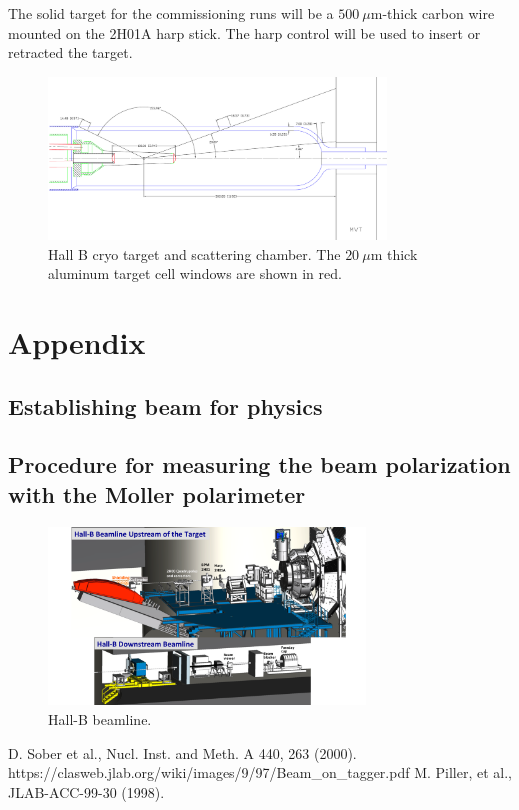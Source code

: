 \documentclass[12pt]{article}
\begin{document}
The solid target for the commissioning runs will be a $500 ~\mu$m-thick carbon wire mounted on the 2H01A harp stick. The harp control will be used to insert or retracted the target.

\begin{figure}[ht!]
\centering
\includegraphics[width=0.8\textwidth]{target.pdf}
\caption{Hall B cryo target and scattering chamber. The $20~\mu$m thick aluminum target cell windows are shown in red.}
\label{target}
\end{figure}

\clearpage

\section{Appendix}

\subsection{Establishing beam for physics}


\subsection{Procedure for measuring the beam polarization with the Moller polarimeter}


\begin{figure}[htb]
\centering
\includegraphics[angle=90,width=0.75\textwidth]{beamline_rendaring.pdf}
\caption{Hall-B beamline.}
\label{fig:bline}
\end{figure}


\begin{thebibliography}{00}
 D. Sober et al., Nucl. Inst. and Meth. A 440, 263 (2000).
 https://clasweb.jlab.org/wiki/images/9/97/Beam\_on\_tagger.pdf
 M. Piller, et al., JLAB-ACC-99-30 (1998).
\end{thebibliography}


%
\end{document}
